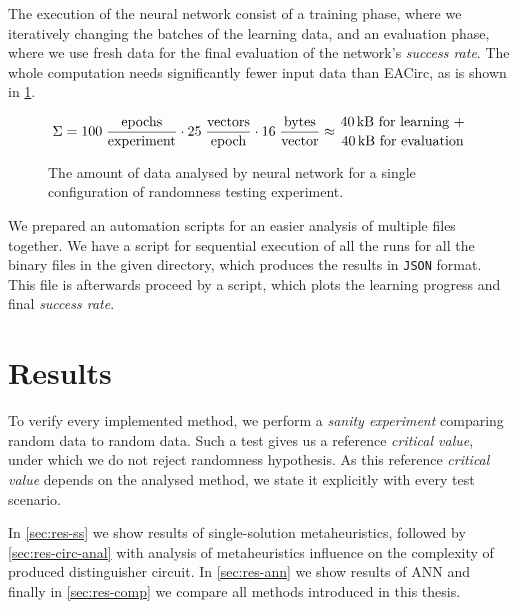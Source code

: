 \documentclass[
    digital,    %
    oneside,    %
    color,
    11pt,
    nocover,
    notable,
    nolof,
    nolot,
]{fithesis3}
\begin{document}
The execution of the neural network consist of a training phase, where we iteratively changing the batches of the learning data, and an evaluation phase, where we use fresh data for the final evaluation of the network's \textit{success rate}. The whole computation needs significantly fewer input data than EACirc, as is shown in \cref{fig:ann-dataUsage}.

\begin{figure}[t]
    \begin{equation*}
        \begin{aligned}
    \Sigma = 
             100 \;
             \frac{\textnormal{epochs}}
                  {\textnormal{experiment}}
             \cdot
             25 \;
             \frac{\textnormal{vectors}}
                  {\textnormal{epoch}}
             \cdot
             16 \;
             \frac{\textnormal{bytes}}
                  {\textnormal{vector}}
             \approx {40 \textnormal{\,kB for learning +} \atop {40 \textnormal{\,kB for evaluation}}}
        \end{aligned}
    \end{equation*}
    \caption{The amount of data analysed by neural network for a single configuration of randomness testing experiment.}
    \label{fig:ann-dataUsage}
\end{figure}

We prepared an automation scripts for an easier analysis of multiple files together. We have a script for sequential execution of all the runs for all the binary files in the given directory, which produces the results in \texttt{JSON} format. This file is afterwards proceed by a script, which plots the learning progress and final \textit{success rate}.


\chapter{Results}
\label{chap:res}

To verify every implemented method, we perform a \textit{sanity experiment} comparing random data to random data. Such a test gives us a reference \textit{critical value}, under which we do not reject randomness hypothesis. As this reference \textit{critical value} depends on the analysed method, we state it explicitly with every test scenario.

In \cref{sec:res-ss} we show results of single-solution metaheuristics, followed by \cref{sec:res-circ-anal} with analysis of metaheuristics influence on the complexity of produced distinguisher circuit. In \cref{sec:res-ann} we show results of ANN and finally in \cref{sec:res-comp} we compare all methods introduced in this thesis.
\end{document}
